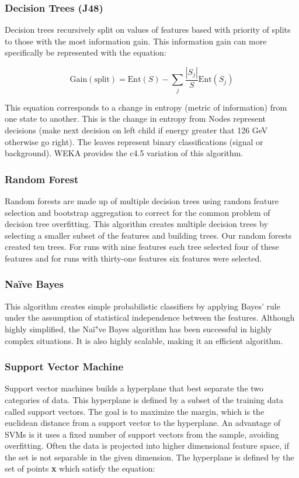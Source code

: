 \documentclass[aps, reprint, amsmath, amssymb]{revtex4-1}
\begin{document}
\subsubsection{Decision Trees (J48)}
Decision trees recursively split on values of features based with priority of splits to those with the most information gain. This information gain can more specifically be represented with the equation:

\begin{equation}
\textrm{Gain} (\textrm{split}) = \textrm{Ent} (S) - \sum \limits_j \dfrac{|S_j|}{S} \textrm{Ent}(S_j)
\end{equation}

This equation corresponds to a change in entropy (metric of information) from one state to another. This is the change in entropy from Nodes represent decisions (make next decision on left child if energy greater that 126 GeV otherwise go right). The leaves represent binary classifications (signal or background). WEKA provides the c4.5 variation of this algorithm.

\subsubsection{Random Forest}
Random forests are made up of multiple decision trees using random feature selection and bootstrap aggregation to correct for the common problem of decision tree overfitting.  This algorithm creates multiple decision trees by selecting a smaller subset of the features and building trees. Our random forests created ten trees.  For runs with nine features each tree selected four of these features and for runs with thirty-one features six features were selected.

\subsubsection{Na{\"i}ve Bayes}
This algorithm creates simple probabilistic classifiers by applying Bayes' rule under the assumption of statistical independence between the features.  Although highly simplified, the Na{\"i"}ve Bayes algorithm has been successful in highly complex situations.  It is also highly scalable, making it an efficient algorithm.  

\subsubsection{Support Vector Machine}
Support vector machines builds a hyperplane that best separate the two categories of data. This hyperplane is defined by a subset of the training data called support vectors. The goal is to maximize the margin, which is the euclidean distance from a support vector to the hyperplane.  An advantage of SVMs is it uses a fixed number of support vectors from the sample, avoiding overfitting.  Often the data is projected into higher dimensional feature space, if the set is not separable in the given dimension.  The hyperplane is defined by the set of points \textbf{x} which satisfy the equation:
\end{document}
